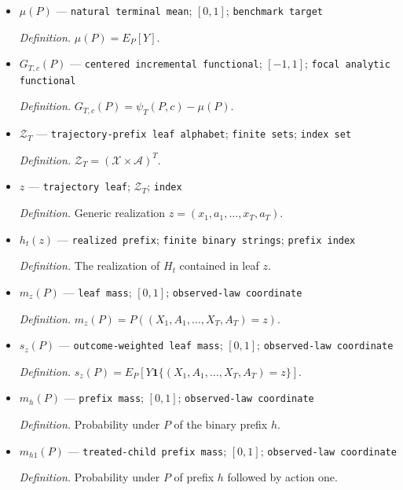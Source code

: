 \documentclass{article}
\begin{document}
\begin{itemize}
  \par\smallskip\noindent\emph{Definition.} Causal target constructed in \(\mathrm{def:estimand}\).
  \item \(\mu(P)\) --- \texttt{natural terminal mean}; \([0,1]\); \texttt{benchmark target}
  \par\smallskip\noindent\emph{Definition.} \(\mu(P)=E_P[Y]\).
  \item \(G_{T,c}(P)\) --- \texttt{centered incremental functional}; \([-1,1]\); \texttt{focal analytic functional}
  \par\smallskip\noindent\emph{Definition.} \(G_{T,c}(P)=\psi_T(P,c)-\mu(P)\).
  \item \(\mathcal Z_T\) --- \texttt{trajectory-\allowbreak{}prefix leaf alphabet}; \texttt{finite sets}; \texttt{index set}
  \par\smallskip\noindent\emph{Definition.} \(\mathcal Z_T=(\mathcal X\times\mathcal A)^T\).
  \item \(z\) --- \texttt{trajectory leaf}; \(\mathcal Z_T\); \texttt{index}
  \par\smallskip\noindent\emph{Definition.} Generic realization \(z=(x_1,a_1,\ldots,x_T,a_T)\).
  \item \(h_t(z)\) --- \texttt{realized prefix}; \texttt{finite binary strings}; \texttt{prefix index}
  \par\smallskip\noindent\emph{Definition.} The realization of \(H_t\) contained in leaf \(z\).
  \item \(m_z(P)\) --- \texttt{leaf mass}; \([0,1]\); \texttt{observed-\allowbreak{}law coordinate}
  \par\smallskip\noindent\emph{Definition.} \(m_z(P)=P((X_1,A_1,\ldots,X_T,A_T)=z)\).
  \item \(s_z(P)\) --- \texttt{outcome-\allowbreak{}weighted leaf mass}; \([0,1]\); \texttt{observed-\allowbreak{}law coordinate}
  \par\smallskip\noindent\emph{Definition.} \(s_z(P)=E_P[Y\mathbf 1\{(X_1,A_1,\ldots,X_T,A_T)=z\}]\).
  \item \(m_h(P)\) --- \texttt{prefix mass}; \([0,1]\); \texttt{observed-\allowbreak{}law coordinate}
  \par\smallskip\noindent\emph{Definition.} Probability under \(P\) of the binary prefix \(h\).
  \item \(m_{h1}(P)\) --- \texttt{treated-\allowbreak{}child prefix mass}; \([0,1]\); \texttt{observed-\allowbreak{}law coordinate}
  \par\smallskip\noindent\emph{Definition.} Probability under \(P\) of prefix \(h\) followed by action one.

\end{itemize}
\end{document}
